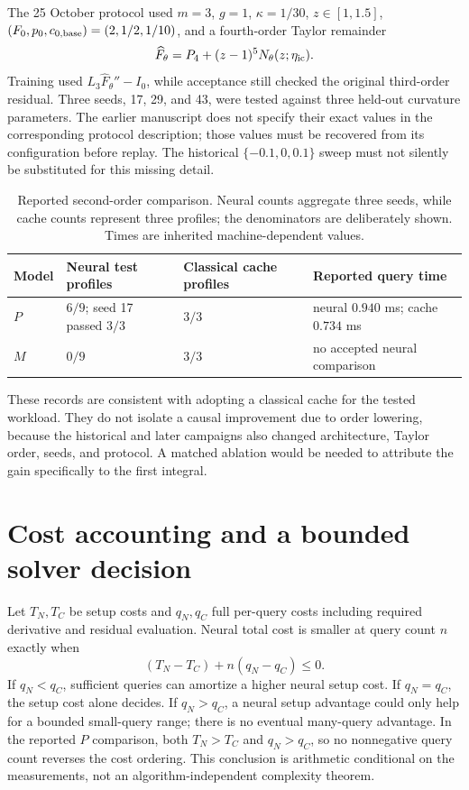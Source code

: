 \documentclass[11pt,a4paper,oneside]{report}
\numberwithin{equation}{chapter}
\begin{document}
The 25 October protocol used $m=3$, $g=1$, $\kappa=1/30$, $z\in[1,1.5]$, $(F_0,p_0,c_{0,\rm base})=(2,1/2,1/10)$, and a fourth-order Taylor remainder
\begin{equation}
\widehat F_\theta=P_4+(z-1)^5N_\theta(z;\eta_{\rm ic}).
\end{equation}
Training used $L_3\widehat F_\theta''-I_0$, while acceptance still checked the original third-order residual. Three seeds, 17, 29, and 43, were tested against three held-out curvature parameters. The earlier manuscript does not specify their exact values in the corresponding protocol description; those values must be recovered from its configuration before replay. The historical $\{-0.1,0,0.1\}$ sweep must not silently be substituted for this missing detail.

\begin{table}[htbp]\centering\small
\begin{tabularx}{\textwidth}{@{}lXXX@{}}\toprule
Model & Neural test profiles & Classical cache profiles & Reported query time\\\midrule
$P$ & $6/9$; seed 17 passed $3/3$ & $3/3$ & neural $0.940$ ms; cache $0.734$ ms\\
$M$ & $0/9$ & $3/3$ & no accepted neural comparison\\\bottomrule
\end{tabularx}
\caption{Reported second-order comparison. Neural counts aggregate three seeds, while cache counts represent three profiles; the denominators are deliberately shown. Times are inherited machine-dependent values.}\label{tab:cache}
\end{table}
These records are consistent with adopting a classical cache for the tested workload. They do not isolate a causal improvement due to order lowering, because the historical and later campaigns also changed architecture, Taylor order, seeds, and protocol. A matched ablation would be needed to attribute the gain specifically to the first integral.

\section{Cost accounting and a bounded solver decision}
Let $T_N,T_C$ be setup costs and $q_N,q_C$ full per-query costs including required derivative and residual evaluation. Neural total cost is smaller at query count $n$ exactly when
\begin{equation}\label{eq:cost}
(T_N-T_C)+n(q_N-q_C)\le0.
\end{equation}
If $q_N<q_C$, sufficient queries can amortize a higher neural setup cost. If $q_N=q_C$, the setup cost alone decides. If $q_N>q_C$, a neural setup advantage could only help for a bounded small-query range; there is no eventual many-query advantage. In the reported $P$ comparison, both $T_N>T_C$ and $q_N>q_C$, so no nonnegative query count reverses the cost ordering. This conclusion is arithmetic conditional on the measurements, not an algorithm-independent complexity theorem.
\end{document}
